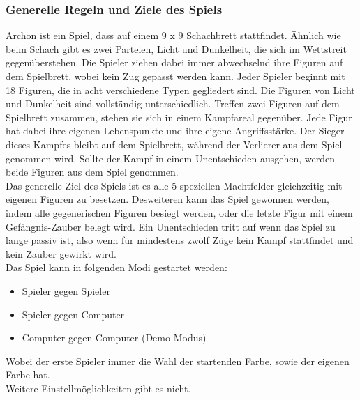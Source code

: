 \subsubsection{Generelle Regeln und Ziele des Spiels}
Archon ist ein Spiel, dass auf einem 9 x 9 Schachbrett stattfindet. Ähnlich wie beim Schach gibt es zwei Parteien, Licht und Dunkelheit, die sich im Wettstreit gegenüberstehen.
Die Spieler ziehen dabei immer abwechselnd ihre Figuren auf dem Spielbrett, wobei kein Zug gepasst werden kann. Jeder Spieler beginnt mit 18 Figuren, die in acht verschiedene Typen gegliedert sind. Die Figuren von Licht und Dunkelheit sind vollständig unterschiedlich. Treffen zwei Figuren auf dem Spielbrett zusammen, stehen sie sich in einem Kampfareal gegenüber. Jede Figur hat dabei ihre eigenen Lebenspunkte und ihre eigene Angriffsstärke. Der Sieger dieses Kampfes bleibt auf dem Spielbrett, während der Verlierer aus dem Spiel genommen wird. Sollte der Kampf in einem Unentschieden ausgehen, werden beide Figuren aus dem Spiel genommen.
\\Das generelle Ziel des Spiels ist es alle 5 speziellen Machtfelder gleichzeitig mit eigenen Figuren zu besetzen.
Desweiteren kann das Spiel gewonnen werden, indem alle gegenerischen Figuren besiegt werden, oder die letzte Figur mit einem Gefängnis-Zauber belegt wird.
Ein Unentschieden tritt auf wenn das Spiel zu lange passiv ist, also wenn für mindestens zwölf Züge kein Kampf stattfindet und kein Zauber gewirkt wird.\\
Das Spiel kann in folgenden Modi gestartet werden: 
\begin{itemize}
	\item Spieler gegen Spieler
	\item Spieler gegen Computer
	\item Computer gegen Computer (Demo-Modus)
\end{itemize}
Wobei der erste Spieler immer die Wahl der startenden Farbe, sowie der eigenen Farbe hat.\\Weitere Einstellmöglichkeiten gibt es nicht.

